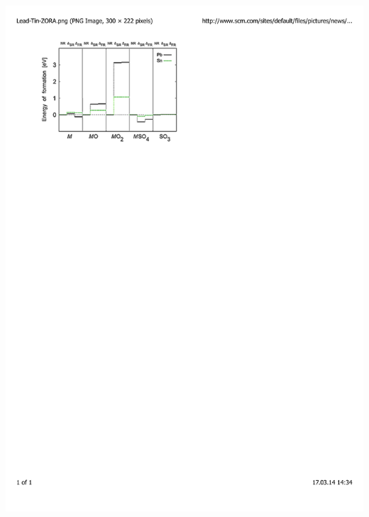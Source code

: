 \documentclass[mathserif,8pt]{beamer}
\begin{document}
\begin{frame}
\begin{columns}
\begin{column}{.40\textwidth}
	\includegraphics[viewport = 50 600 300 800, clip, scale=0.5]{figures/lead_acid.pdf}
    \end{column}
    \end{columns}
\end{frame}
\end{document}
